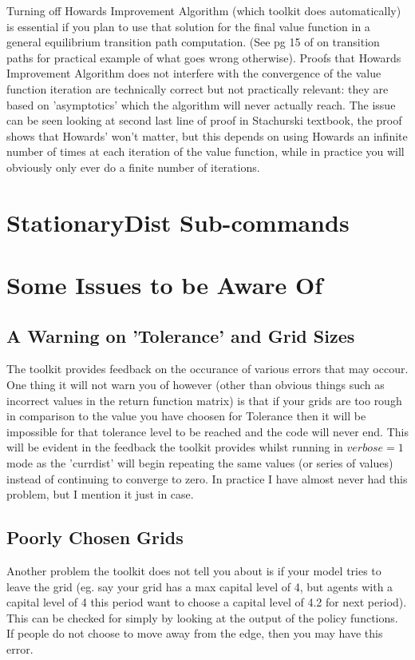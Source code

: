 \documentclass[11pt,fleqn]{article}
\begin{document}
Turning off Howards Improvement Algorithm (which toolkit does automatically) is essential if you plan to use that solution for the final value function in a general equilibrium transition path computation. (See pg 15 of \cite*{KirkbyBHATransitions} on transition paths for practical example of what goes wrong otherwise). Proofs that Howards Improvement Algorithm does not interfere with the convergence of the value function iteration are technically correct but not practically relevant: they are based on 'asymptotics' which the algorithm will never actually reach. The issue can be seen looking at second last line of proof in Stachurski textbook, the proof shows that Howards' won't matter, but this depends on using Howards an infinite number of times at each iteration of the value function, while in practice you will obviously only ever do a finite number of iterations.

\newpage

\section{StationaryDist Sub-commands} \label{appendix:StationaryDist}

\newpage

\section{Some Issues to be Aware Of}
\subsection{A Warning on 'Tolerance' and Grid Sizes}
The toolkit provides feedback on the occurance of various errors that may occour. One thing it will not warn you of however (other than obvious things such as incorrect values in the return function matrix) is that if your grids are too rough in comparison to the value you have choosen for Tolerance then it will be impossible for that tolerance level to be reached and the code will never end. This will be evident in the feedback the toolkit provides whilst running in $verbose=1$ mode as the 'currdist' will begin repeating the same values (or series of values) instead of continuing to converge to zero. In practice I have almost never had this problem, but I mention it just in case.

\subsection{Poorly Chosen Grids}
Another problem the toolkit does not tell you about is if your model tries to leave the grid (eg. say your grid has a max capital level of 4, but agents with a capital level of 4 this period want to choose a capital level of 4.2 for next period). This can be checked for simply by looking at the output of the policy functions. If people do not choose to move away from the edge, then you may have this error.
\end{document}
